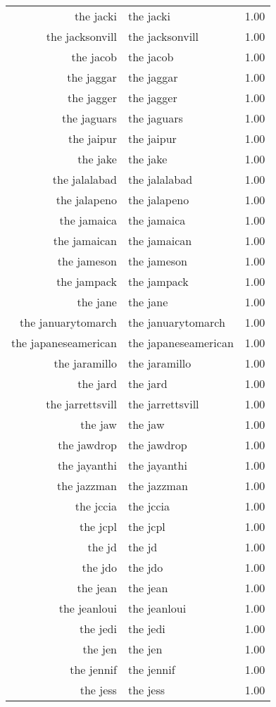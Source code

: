 \begin{table}[ht]
\begin{tabular}{rlr}
  the jacki & the jacki & 1.00 \\ 
  the jacksonvill & the jacksonvill & 1.00 \\ 
  the jacob & the jacob & 1.00 \\ 
  the jaggar & the jaggar & 1.00 \\ 
  the jagger & the jagger & 1.00 \\ 
  the jaguars & the jaguars & 1.00 \\ 
  the jaipur & the jaipur & 1.00 \\ 
  the jake & the jake & 1.00 \\ 
  the jalalabad & the jalalabad & 1.00 \\ 
  the jalapeno & the jalapeno & 1.00 \\ 
  the jamaica & the jamaica & 1.00 \\ 
  the jamaican & the jamaican & 1.00 \\ 
  the jameson & the jameson & 1.00 \\ 
  the jampack & the jampack & 1.00 \\ 
  the jane & the jane & 1.00 \\ 
  the januarytomarch & the januarytomarch & 1.00 \\ 
  the japaneseamerican & the japaneseamerican & 1.00 \\ 
  the jaramillo & the jaramillo & 1.00 \\ 
  the jard & the jard & 1.00 \\ 
  the jarrettsvill & the jarrettsvill & 1.00 \\ 
  the jaw & the jaw & 1.00 \\ 
  the jawdrop & the jawdrop & 1.00 \\ 
  the jayanthi & the jayanthi & 1.00 \\ 
  the jazzman & the jazzman & 1.00 \\ 
  the jccia & the jccia & 1.00 \\ 
  the jcpl & the jcpl & 1.00 \\ 
  the jd & the jd & 1.00 \\ 
  the jdo & the jdo & 1.00 \\ 
  the jean & the jean & 1.00 \\ 
  the jeanloui & the jeanloui & 1.00 \\ 
  the jedi & the jedi & 1.00 \\ 
  the jen & the jen & 1.00 \\ 
  the jennif & the jennif & 1.00 \\ 
  the jess & the jess & 1.00 \\ 

\end{tabular}
\end{table}
